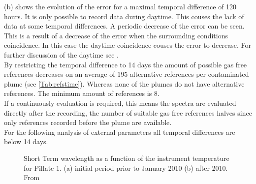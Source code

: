 \documentclass  [
  paper    = a4,
  BCOR     = 10mm,
  twoside,
  fontsize = 12pt,
  fleqn,
  toc      = bibnumbered,
  toc      = listofnumbered,
  numbers  = noendperiod,
  headings = normal,
  listof   = leveldown,
  version  = 3.03
]                                       {scrreprt}
\begin{document}
	  (b) shows the evolution of the  error for a maximal temporal difference of 120 hours. It is only possible to record data during daytime. This couses the lack of data at some temporal differences. A periodic decrease of the   error can be seen. This is a result of a decrease of the   error when the surrounding conditions coincidence. In this case the daytime coincidence couses the   error to decrease. For further discussion of the daytime see .\\
	By restricting the temporal difference to 14 days the amount of possible gas free references decreases on an average of 195 alternative references per contaminated plume (see \cref{Tab:refstime}). Whereas none of the plumes do not have alternative references. The minimum amount of references is 8.\\
	If a continuously evaluation is required, this means the spectra are evaluated directly after the recording, the number of suitable gas free references halves since only references recorded before the plume are available.\\
	For the following analysis of external parameters all temporal differences are below 14 days.
	\begin{figure}		
		\caption{Short Term wavelength as a function of the instrument temperature for Pillate 1. (a) initial period  prior to January 2010 (b) after 2010. From \cite{WarnachSimon}}
		\label{fig:shorttermshift}
	\end{figure}
\end{document}
